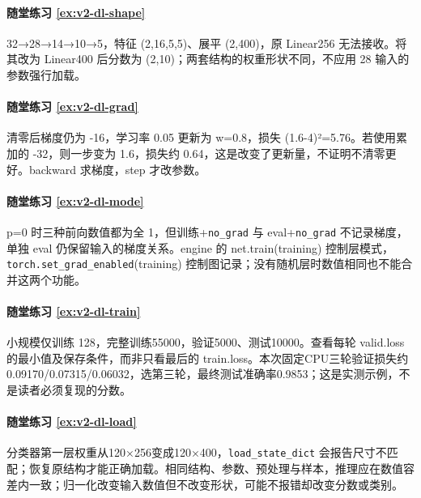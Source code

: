 \paragraph*{随堂练习 \ref{ex:v2-dl-shape}}
\begin{solution}
32→28→14→10→5，特征 (2,16,5,5)、展平 (2,400)，原 Linear256 无法接收。将其改为 Linear400 后分数为 (2,10)；两套结构的权重形状不同，不应用 28 输入的参数强行加载。
\end{solution}

\paragraph*{随堂练习 \ref{ex:v2-dl-grad}}
\begin{solution}
清零后梯度仍为 -16，学习率 0.05 更新为 w=0.8，损失 (1.6-4)²=5.76。若使用累加的 -32，则一步变为 1.6，损失约 0.64，这是改变了更新量，不证明不清零更好。backward 求梯度，step 才改参数。
\end{solution}

\paragraph*{随堂练习 \ref{ex:v2-dl-mode}}
\begin{solution}
p=0 时三种前向数值都为全 1，但训练+\texttt{no\_grad} 与 eval+\texttt{no\_grad} 不记录梯度，单独 eval 仍保留输入的梯度关系。engine 的 net.train(training) 控制层模式，\texttt{torch.set\_grad\_enabled}(training) 控制图记录；没有随机层时数值相同也不能合并这两个功能。
\end{solution}

\paragraph*{随堂练习 \ref{ex:v2-dl-train}}
\begin{solution}
小规模仅训练 128，完整训练55000，验证5000、测试10000。查看每轮 valid.loss 的最小值及保存条件，而非只看最后的 train.loss。本次固定CPU三轮验证损失约0.09170/0.07315/0.06032，选第三轮，最终测试准确率0.9853；这是实测示例，不是读者必须复现的分数。
\end{solution}

\paragraph*{随堂练习 \ref{ex:v2-dl-load}}
\begin{solution}
分类器第一层权重从120×256变成120×400，\texttt{load\_state\_dict} 会报告尺寸不匹配；恢复原结构才能正确加载。相同结构、参数、预处理与样本，推理应在数值容差内一致；归一化改变输入数值但不改变形状，可能不报错却改变分数或类别。
\end{solution}

